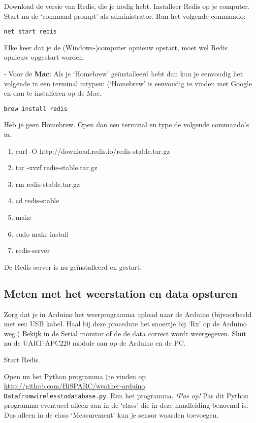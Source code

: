 Download de versie van Redis, die je nodig hebt.
Installeer Redis op je computer. Start nu de `command prompt' als administrator.
Run het volgende commando:

\begin{verbatim}
net start redis
\end{verbatim}

Elke keer dat je de (Windows-)computer opnieuw opstart, moet wel Redis opnieuw
opgestart worden.

- Voor de \textbf{Mac}:
Als je `Homebrew' geïnstalleerd hebt dan kun je eenvoudig het volgende
in een terminal intypen: (`Homebrew' is eenvoudig te vinden met Google
en dan te installeren op de Mac.

\begin{verbatim}
brew install redis
\end{verbatim}

Heb je geen Homebrew. Open dan een terminal en type de volgende commando's in.

\begin{enumerate}
    \item curl -O http://download.redis.io/redis-stable.tar.gz
    \item tar -xvzf redis-stable.tar.gz
    \item rm redis-stable.tar.gz
    \item cd redis-stable
    \item make
    \item sudo make install
    \item redis-server
\end{enumerate}

De Redis server is nu geïnstalleerd en gestart.


\subsection{Meten met het weerstation en data opsturen}

Zorg dat je in Arduino het weerprogramma upload naar de Arduino
(bijvoorbeeld met een USB kabel. Haal bij deze procedure het snoertje bij `Rx' op de
Arduino weg.) Bekijk in de Serial monitor of de de data correct wordt
weergegeven. Sluit nu de UART-APC220 module aan op de Arduino en de PC.

Start Redis.

Open nu het Python programma (te vinden op
\url{http://github.com/HiSPARC/weather-arduino}. \verb|Datafromwirelesstodatabase.py|.
Run het programma.
\emph{!Pas op!} Pas dit Python programma eventueel alleen aan in de `class' die in deze
handleiding benoemd is. Dus alleen in de class `Measurement' kun je sensor waarden
toevoegen.

